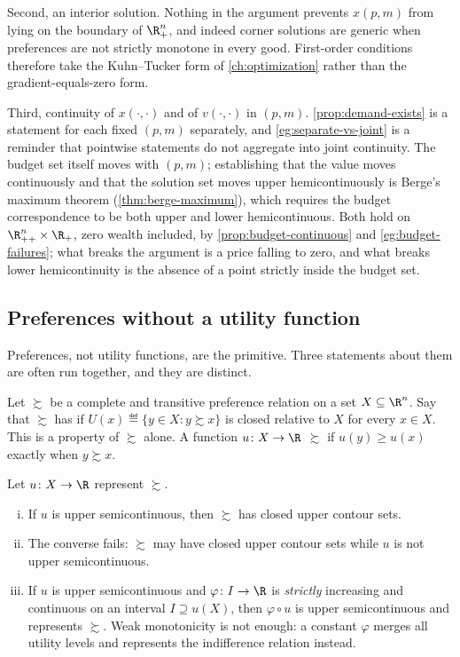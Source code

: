 Second, an interior solution. Nothing in the argument prevents
$x(p,m)$ from lying on the boundary of $\R^n_+$, and indeed corner solutions are
generic when preferences are not strictly monotone in every good. First-order
conditions therefore take the Kuhn--Tucker form of \autoref{ch:optimization}
rather than the gradient-equals-zero form.

Third, continuity of $x(\cdot,\cdot)$ and of $v(\cdot,\cdot)$ in $(p,m)$.
\autoref{prop:demand-exists} is a statement for each fixed $(p,m)$ separately,
and \autoref{eg:separate-vs-joint} is a reminder that pointwise statements do
not aggregate into joint continuity. The budget set itself moves with
$(p,m)$; establishing that the value moves continuously and that the solution
set moves upper hemicontinuously is Berge's maximum theorem
(\autoref{thm:berge-maximum}), which requires the budget correspondence to be
both upper and lower hemicontinuous. Both hold on $\R^{n}_{++}\times\R_{+}$,
zero wealth included, by \autoref{prop:budget-continuous} and
\autoref{eg:budget-failures}; what breaks the argument is a price falling to
zero, and what breaks lower hemicontinuity is the absence of a point strictly
inside the budget set.

\subsection{Preferences without a utility function}\label{subsec:cont-preferences}

Preferences, not utility functions, are the primitive. Three statements about
them are often run together, and they are distinct.

Let $\succsim$ be a complete and transitive preference relation on a set
$X\subseteq\R^n$. Say that $\succsim$ has  if $U(x)\eqdef\{y\in X : y\succsim x\}$ is closed
relative to $X$ for every $x\in X$. This is a property of $\succsim$ alone. A
function $u\colon X\to\R$  $\succsim$ if $u(y)\geq u(x)$ exactly
when $y\succsim x$.

\begin{proposition}
	\label{prop:usc-preferences}
	Let $u\colon X\to\R$ represent $\succsim$.
	\begin{enumerate}[(i)]
		\item If $u$ is upper semicontinuous, then $\succsim$ has closed upper
		      contour sets.
		\item The converse fails: $\succsim$ may have closed upper contour sets while
		      $u$ is not upper semicontinuous.
		\item If $u$ is upper semicontinuous and $\varphi\colon I\to\R$ is
		      \emph{strictly} increasing and continuous on an interval
		      $I\supseteq u(X)$, then $\varphi\circ u$ is upper semicontinuous and
		      represents $\succsim$. Weak monotonicity is not enough: a constant
		      $\varphi$ merges all utility levels and represents the indifference
		      relation instead.
	\end{enumerate}
\end{proposition}

